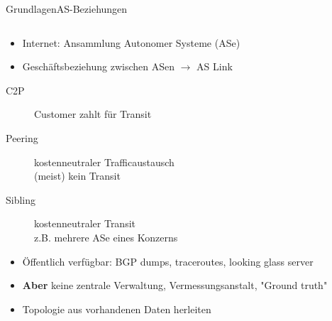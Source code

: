 \documentclass[ngerman,compress,hyperref={bookmarks}]{beamer}
\begin{document}
\begin{frame}[allowframebreaks]{Grundlagen}{AS-Beziehungen}
\framebreak
  \begin{columns}[c]
    \begin{column}{0.75\textwidth}
      \begin{itemize}
        \item Internet: Ansammlung Autonomer Systeme (ASe)
        \item Geschäftsbeziehung zwischen ASen $\rightarrow$ AS Link
      \end{itemize}
      \begin{description}
        \item[C2P] Customer zahlt für Transit
        \item[Peering] kostenneutraler Trafficaustausch\\{\scriptsize(meist) kein Transit}
        \item[Sibling] kostenneutraler Transit\\{\scriptsize z.B. mehrere ASe eines Konzerns}
      \end{description}
      \begin{itemize}
        \item Öffentlich verfügbar: BGP dumps, traceroutes, looking glass server
        \item \textbf{Aber} keine zentrale Verwaltung, Vermessungsanstalt, "Ground truth"
        \item Topologie aus vorhandenen Daten herleiten
      \end{itemize}
    \end{column}
  \end{columns}
\end{frame}
\end{document}

